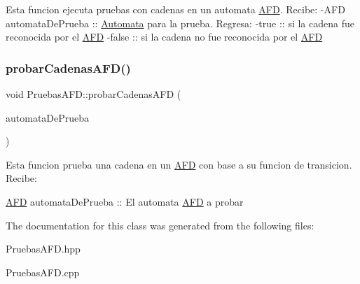 Esta funcion ejecuta pruebas con cadenas en un automata \hyperlink{class_a_f_d}{A\+FD}. Recibe\+: -\/\+A\+FD automata\+De\+Prueba \+:\+: \hyperlink{class_automata}{Automata} para la prueba. Regresa\+: -\/true \+:\+: si la cadena fue reconocida por el \hyperlink{class_a_f_d}{A\+FD} -\/false \+:\+: si la cadena no fue reconocida por el \hyperlink{class_a_f_d}{A\+FD} \mbox{\label{class_pruebas_a_f_d_ab377ec9490bd437af165410a3ff10fd4}} 
\subsubsection{\texorpdfstring{probar\+Cadenas\+A\+F\+D()}{probarCadenasAFD()}}
{\footnotesize\ttfamily void Pruebas\+A\+F\+D\+::probar\+Cadenas\+A\+FD (\begin{DoxyParamCaption}\item[{\hyperlink{class_a_f_d}{A\+FD}}]{automata\+De\+Prueba }\end{DoxyParamCaption})}

Esta funcion prueba una cadena en un \hyperlink{class_a_f_d}{A\+FD} con base a su funcion de transicion. Recibe\+:
\begin{DoxyItemize}
\item \hyperlink{class_a_f_d}{A\+FD} automata\+De\+Prueba \+:\+: El automata \hyperlink{class_a_f_d}{A\+FD} a probar 
\end{DoxyItemize}

The documentation for this class was generated from the following files\+:\begin{DoxyCompactItemize}
\item 
Pruebas\+A\+F\+D.\+hpp\item 
Pruebas\+A\+F\+D.\+cpp\end{DoxyCompactItemize}
